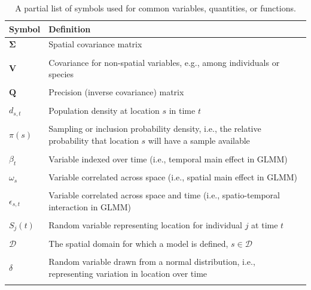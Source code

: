 \begin{table}
  \caption[Notation for commonly used variables]{A partial list of symbols used for common variables, quantities, or functions.}
\begin{center}
\begin{tabularx}{\textwidth}{ | X m{4in} | } 
  \hline
  Symbol & Definition \\ 
  \hline
  \( \mathbf{\Sigma} \) & Spatial covariance matrix \\ & \\ 

  \( \mathbf{V} \) & Covariance for non-spatial variables, e.g., among individuals or species \\ & \\ 

  \( \mathbf{Q} \) & Precision (inverse covariance) matrix \\ & \\ 

  \( d_{s,t} \) &  Population density at location \(s\) in time \(t\) \\ & \\

  \( \pi(s) \) &  Sampling or inclusion probability density, i.e., the relative probability that location \(s\) will have a sample available \\ & \\

  \( \beta_t \) & Variable indexed over time (i.e., temporal main effect in GLMM)  \\ & \\ 

  \( \omega_{s} \) & Variable correlated across space (i.e., spatial main effect in GLMM) \\ & \\

  \( \epsilon_{s,t}\) & Variable correlated across space and time (i.e., spatio-temporal interaction in GLMM) \\ & \\

  \( S_j(t) \) & Random variable representing location for individual \(j\) at time \(t\) \\ & \\

  \( \mathcal{D} \) & The spatial domain for which a model is defined, \(s \in \mathcal{D}\) \\ & \\
  
  \( \delta \) & Random variable drawn from a normal distribution, i.e., representing variation in location over time \\ & \\


\end{tabularx}
\end{center}
\end{table}
